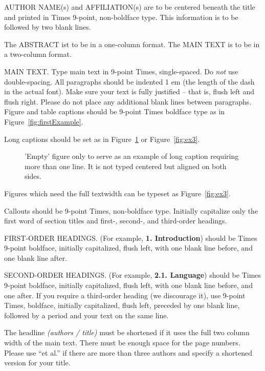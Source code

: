 \documentclass{egpubl-eurovis-short}
\begin{document}
AUTHOR NAME(s) and AFFILIATION(s) are to be centered beneath the title and
printed in Times 9-point, non-boldface type. This information is to be
followed by two blank lines.

The ABSTRACT ist to be in a one-column format. The MAIN TEXT is to be in a
two-column format.

MAIN TEXT. Type main text in 9-point Times, single-spaced. Do \emph{not} use
double-spacing. All paragraphs should be indented 1 em (the length of the
dash in the actual font). Make sure your text is fully justified -- that is,
flush left and flush right. Please do not place any additional blank lines
between paragraphs. Figure and table captions should be 9-point Times
boldface type as in Figure~\ref{fig:firstExample}.

\noindent Long captions should be set as in Figure~\ref{fig:ex1} or
Figure~\ref{fig:ex3}.

\begin{figure}[htb]
   \caption{\label{fig:ex1}
     'Empty' figure only to serve as an example of long caption requiring 
     more than one line. It is not typed centered but aligned on both sides.}
\end{figure}

\noindent
Figures which need the full textwidth can be typeset as Figure~\ref{fig:ex3}.

\noindent Callouts should be 9-point Times, non-boldface type. Initially
capitalize only the first word of section titles and first-, second-, and
third-order headings.

FIRST-ORDER HEADINGS. (For example, \textbf{1. Introduction}) should be Times
9-point boldface, initially capitalized, flush left, with one blank line
before, and one blank line after.

SECOND-ORDER HEADINGS. (For example, \textbf{2.1. Language}) should be Times
9-point boldface, initially capitalized, flush left, with one blank line
before, and one after. If you require a third-order heading (we discourage
it), use 9-point Times, boldface, initially capitalized, flush left, preceded
by one blank line, followed by a period and your text on the same line.

The headline \emph{(authors / title)} must be shortened if it uses the full 
two column width of the main text.
There must be enough space for the page numbers. Please use ``et al.'' if 
there are more than three authors and specify a shortened version for your title.
\end{document}
